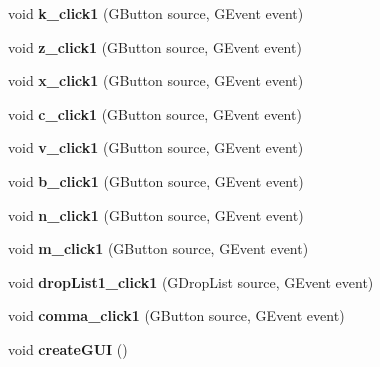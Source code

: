 \begin{DoxyCompactItemize}
\item 
\hypertarget{classkeyplayer__gui_ad1112af5917ef5893f3a74c12d3b4033}{void {\bfseries k\+\_\+click1} (G\+Button source, G\+Event event)}\label{classkeyplayer__gui_ad1112af5917ef5893f3a74c12d3b4033}

\item 
\hypertarget{classkeyplayer__gui_a9358671feb3647c62320f4ed0494c679}{void {\bfseries z\+\_\+click1} (G\+Button source, G\+Event event)}\label{classkeyplayer__gui_a9358671feb3647c62320f4ed0494c679}

\item 
\hypertarget{classkeyplayer__gui_a1e0d6a4fc310c0ab5b224926752dd311}{void {\bfseries x\+\_\+click1} (G\+Button source, G\+Event event)}\label{classkeyplayer__gui_a1e0d6a4fc310c0ab5b224926752dd311}

\item 
\hypertarget{classkeyplayer__gui_a8249626935c9c8f0b936eb33ff1f0574}{void {\bfseries c\+\_\+click1} (G\+Button source, G\+Event event)}\label{classkeyplayer__gui_a8249626935c9c8f0b936eb33ff1f0574}

\item 
\hypertarget{classkeyplayer__gui_af7978615d001865ba873dac37833bc5f}{void {\bfseries v\+\_\+click1} (G\+Button source, G\+Event event)}\label{classkeyplayer__gui_af7978615d001865ba873dac37833bc5f}

\item 
\hypertarget{classkeyplayer__gui_a833e7299355e68fcf35adb3734a1b600}{void {\bfseries b\+\_\+click1} (G\+Button source, G\+Event event)}\label{classkeyplayer__gui_a833e7299355e68fcf35adb3734a1b600}

\item 
\hypertarget{classkeyplayer__gui_a85031d9dedc3f0e846cf5e141f40c61c}{void {\bfseries n\+\_\+click1} (G\+Button source, G\+Event event)}\label{classkeyplayer__gui_a85031d9dedc3f0e846cf5e141f40c61c}

\item 
\hypertarget{classkeyplayer__gui_aee327a5948eef77ba8f2609023b65794}{void {\bfseries m\+\_\+click1} (G\+Button source, G\+Event event)}\label{classkeyplayer__gui_aee327a5948eef77ba8f2609023b65794}

\item 
\hypertarget{classkeyplayer__gui_a0fcc88c551f51dc5bf6cdf7464e06e99}{void {\bfseries drop\+List1\+\_\+click1} (G\+Drop\+List source, G\+Event event)}\label{classkeyplayer__gui_a0fcc88c551f51dc5bf6cdf7464e06e99}

\item 
\hypertarget{classkeyplayer__gui_aebf8fc3b2d71c89fc833cfced7cdcdf5}{void {\bfseries comma\+\_\+click1} (G\+Button source, G\+Event event)}\label{classkeyplayer__gui_aebf8fc3b2d71c89fc833cfced7cdcdf5}

\item 
\hypertarget{classkeyplayer__gui_a481022badc755a391818234a23deab44}{void {\bfseries create\+G\+U\+I} ()}\label{classkeyplayer__gui_a481022badc755a391818234a23deab44}

\end{DoxyCompactItemize}
